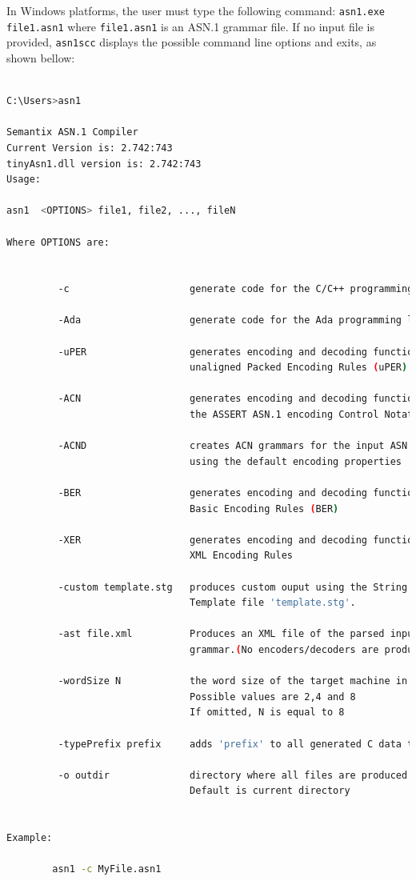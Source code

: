 \documentclass[11pt]{book}
\begin{document}
In Windows platforms, the user must type the following command:
\texttt{asn1.exe file1.asn1} where \texttt{file1.asn1} is an ASN.1 grammar file.
If no input file is provided, \texttt{asn1scc} displays the possible command line 
options and exits, as shown bellow:

\begin{lstlisting}[language=bash]

C:\Users>asn1

Semantix ASN.1 Compiler
Current Version is: 2.742:743
tinyAsn1.dll version is: 2.742:743
Usage:

asn1  <OPTIONS> file1, file2, ..., fileN

Where OPTIONS are:


         -c                     generate code for the C/C++ programming language

         -Ada                   generate code for the Ada programming language

         -uPER                  generates encoding and decoding functions for
                                unaligned Packed Encoding Rules (uPER)

         -ACN                   generates encoding and decoding functions using
                                the ASSERT ASN.1 encoding Control Notation

         -ACND                  creates ACN grammars for the input ASN.1 grammars
                                using the default encoding properties

         -BER                   generates encoding and decoding functions for.
                                Basic Encoding Rules (BER)

         -XER                   generates encoding and decoding functions for
                                XML Encoding Rules

         -custom template.stg   produces custom ouput using the String
                                Template file 'template.stg'.

         -ast file.xml          Produces an XML file of the parsed input ASN.1
                                grammar.(No encoders/decoders are produced)

         -wordSize N            the word size of the target machine in bytes.
                                Possible values are 2,4 and 8
                                If omitted, N is equal to 8

         -typePrefix prefix     adds 'prefix' to all generated C data types.

         -o outdir              directory where all files are produced.
                                Default is current directory


Example:

        asn1 -c MyFile.asn1
\end{lstlisting}
\end{document}
